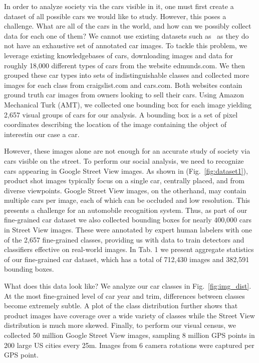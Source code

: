 \documentclass[letterpaper]{article}
\begin{document}
In order to analyze society via the cars visible in it, one must first create a dataset of all possible cars we would like to study. However, this poses a challenge. What are all of the cars in the world, and how can we possibly collect data for each one of them? We cannot use existing datasets such as~\cite{imagenet} as they do not have an exhaustive set of annotated car images.
To tackle this problem, we leverage existing knowledgebases of cars, downloading images and data for roughly 18,000 different types of cars from the website edmunds.com. We then grouped these car types into sets of indistinguishable classes and collected more images for each class from craigslist.com and cars.com. Both websites contain ground truth car images from owners looking to sell their cars.  Using Amazon Mechanical Turk (AMT), we collected one bounding box for each image yielding 2,657 visual groups of cars for our analysis.  A bounding box is a set of pixel coordinates describing the location of the image containing the object of interest\textemdash in our case a car.

However, these images alone are not enough for an accurate study of society via cars visible on the street. To perform our social analysis, we need to recognize cars appearing in Google Street View images. As shown in (Fig.~\ref{fig:dataset1}), product shot images typically focus on a single car, centrally placed, and from diverse viewpoints. Google Street View images, on the otherhand, may contain multiple cars per image, each of which can be occluded and low resolution. This presents a challenge for an automobile recognition system. Thus, as part of our fine-grained car dataset we also collected bounding boxes for nearly 400,000 cars in Street View images. These were annotated by expert human labelers with one of the 2,657 fine-grained classes, providing us with data to train detectors and classifiers effective on real-world images. In Tab. 1 we present aggregate statistics of our fine-grained car dataset, which has a total of 712,430 images and 382,591 bounding boxes.

What does this data look like? We analyze our car classes in Fig.~\ref{fig:img_dist}. At the most fine-grained level of car year and trim, differences between classes become extremely subtle. A plot of the class distribution further shows that product images have coverage over a wide variety of classes while the Street View distribution is much more skewed. Finally, to perform our visual census, we collected 50 million Google Street View images, sampling 8 million GPS points in 200 large US cities every 25m. Images from 6 camera rotations were captured per GPS point.
\end{document}
